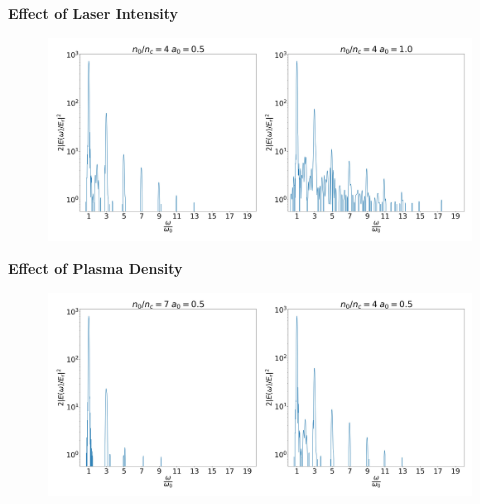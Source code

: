 \documentclass{beamer}
\begin{document}
\begin{frame}
    \small
    \textbf{Effect of Laser Intensity}
    \begin{figure}
        \centering
        \includegraphics[width=1.0\textwidth, height=0.40\textheight]{images/intensity.jpg}
        \label{fig:LaserIntensity}
    \end{figure}
    \textbf{Effect of Plasma Density}
    \begin{figure}
        \centering
        \includegraphics[width=1.0\textwidth, height=0.40\textheight]{images/density.jpg}
        \label{fig:PlasmaDensity}
    \end{figure}
\end{frame}
\end{document}
